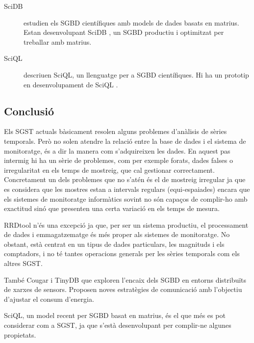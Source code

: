 \begin{description}
\item[SciDB]
\textcite{stonebraker09:scidb} estudien els SGBD científiques amb models  de dades basats en matrius. Estan desenvolupant SciDB \parencite{scidb}, un SGBD productiu i optimitzat per treballar amb matrius.


\item[SciQL]
\textcite{kersten11} descriuen SciQL, un llenguatge per a SGBD científiques. Hi ha un prototip en desenvolupament de SciQL \parencite{sciql}.


\end{description}


\subsection{Conclusió}

Els SGST actuals bàsicament resolen alguns problemes d'anàlisis de sèries temporals.
Però no solen atendre la relació entre la base de dades i el sistema de monitoratge, és a dir la manera com s'adquireixen les dades. En aquest pas intermig hi ha un sèrie de problemes, com per exemple forats, dades falses o irregularitat en els temps de mostreig, que cal gestionar correctament. Concretament un dels problemes que no s'atén és el de mostreig irregular ja que es considera que les mostres estan a intervals regulars (equi-espaiades) encara que els sistemes de monitoratge informàtics sovint no són capaços de complir-ho amb exactitud sinó que presenten una certa variació en els temps de mesura. 

RRDtool n'és una excepció ja que, per ser un sistema productiu, el processament de dades i emmagatzematge és més proper als sistemes de monitoratge. No obstant, està centrat en un tipus de dades particulars, les magnituds i els comptadors, i no té tantes operacions generals per les sèries temporals com els altres SGST.

També Cougar i TinyDB que exploren l'encaix dels SGBD en entorns distribuïts de xarxes de sensors. Proposen noves estratègies de comunicació amb l'objectiu d'ajustar el consum d'energia. 


SciQL, un model recent per SGBD  basat en matrius, és el que més es pot considerar com a SGST, ja que s'està desenvolupant per complir-ne algunes propietats.




